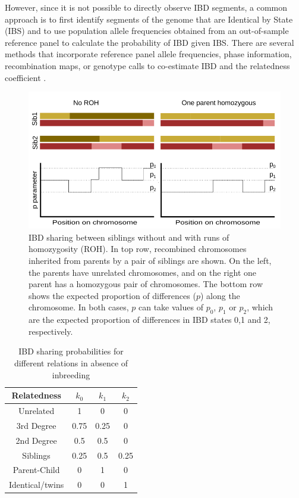 \documentclass[12pt, letterpaper]{article}
\begin{document}
However, since it is not possible to directly observe IBD segments, a common approach is to first identify segments of the genome that are Identical by State (IBS) and to use population allele frequencies obtained from an out-of-sample reference panel to calculate the probability of IBD given IBS. There are several methods that incorporate reference panel allele frequencies, phase information, recombination maps, or genotype calls to co-estimate IBD and the relatedness coefficient \cite{huff_maximum-likelihood_2011,li_relationship_2014,thornton_estimating_2012, boehnke_accurate_1997,lynch_estimation_1999, purcell_plink_2007,manichaikul_robust_2010,gusev_whole_2009,nyerki_optimized_2022,browning_fast_2011,li_accurate_2014}.

\begin{figure}[h!]
    \includegraphics[width=18cm]{plots/inkscape_finalImg/schematic_sib.png}
    \centering
    \caption{IBD sharing between siblings without and with runs of homozygosity (ROH). In top row, recombined chromosomes inherited from parents by a pair of siblings are shown. On the left, the parents have unrelated chromosomes, and on the right one parent has a homozygous pair of chromosomes. The bottom row shows the expected proportion of differences ($p$) along the chromosome. In both cases, $p$ can take values of $p_0$, $p_1$ or $p_2$, which are the expected proportion of differences in IBD states 0,1 and 2, respectively.  }
    \label{fig0:schematic}
\end{figure}


\begin{table}[h!]
\caption{\label{tab:Table 1}IBD sharing probabilities for different relations in absence of inbreeding}
\begin{tabular}{|c|c|c|c|}
    \hline
    Relatedness & $k_0$ & $k_1$ & $k_2$\\
    \hline
    Unrelated & 1 & 0 & 0\\
    \hline
    3rd Degree & 0.75 & 0.25 & 0\\
    \hline
    2nd Degree & 0.5 & 0.5 & 0\\
    \hline
    Siblings & 0.25 & 0.5 & 0.25\\
    \hline
    Parent-Child & 0 & 1 & 0\\
    \hline
    Identical/twins & 0 & 0 & 1\\
    \hline
\end{tabular}
\label{table1}
\end{table}
\end{document}
